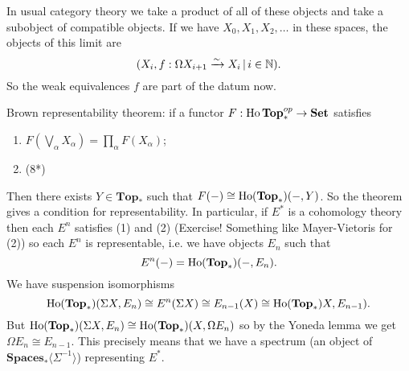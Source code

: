 \documentclass[../MH_Total.tex]{subfiles}
\begin{document}
\begin{example}
	In usual category theory we take a product of all of these objects and take a subobject of compatible objects. If we have $X_0,X_1,X_2,\dots$ in these spaces, the objects of this limit are
	\[
	(X_i, f: \Omega X_{i+1} \xrightarrow{\sim} X_i \,|\, i \in \mathbb{N}). 
	\]
	So the weak equivalences $f$ are part of the datum now.

	Brown representability theorem: if a functor $F: \operatorname{Ho}\mathbf{Top}_*^{op} \to \mathbf{Set}$ satisfies
	\begin{enumerate}
		\item $F(\bigvee_\alpha X_\alpha) = \prod_\alpha F(X_\alpha)$;
		\item (8*)
	\end{enumerate}
	Then there exists $Y \in \mathbf{Top}_*$ such that $F(-) \cong \operatorname{Ho}(\mathbf{Top}_*)(-,Y)$. So the theorem gives a condition for representability. In particular, if $E^*$ is a cohomology theory then each $E^n$ satisfies (1) and (2) (Exercise! Something like Mayer-Vietoris for (2)) so each $E^n$ is representable, i.e. we have objects $E_n$ such that
	\[
	E^n(-) = \operatorname{Ho}(\mathbf{Top}_*)(-,E_n). 
	\]
	We have suspension isomorphisms
	\[
	\operatorname{Ho}(\mathbf{Top}_*)(\Sigma X,E_n) \cong E^n(\Sigma X) \cong E_{n-1}(X) \cong \operatorname{Ho}(\mathbf{Top}_*)X,E_{n-1}). 
	\]
	But $\operatorname{Ho}(\mathbf{Top}_*)(\Sigma X,E_n) \cong \operatorname{Ho}(\mathbf{Top}_*)(X,\Omega E_n)$ so by the Yoneda lemma we get $\Omega E_n \cong E_{n-1}$. This precisely means that we have a spectrum (an object of $\mathbf{Spaces}_*\langle \Sigma^{-1} \rangle$) representing $E^*$.
\end{example}

% 
\end{document}
